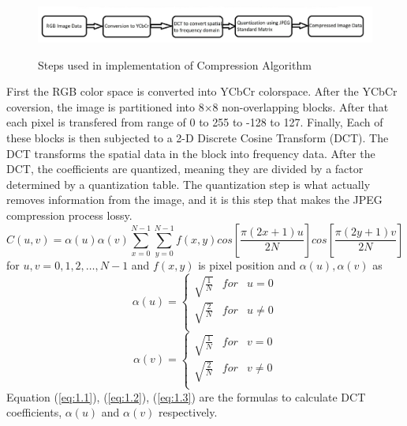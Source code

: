 \begin{figure}[H]
    \includegraphics[width=1\textwidth]{./img/compression.png}\\
    \caption{ Steps used in implementation of Compression Algorithm\cite{15}}
\end{figure}
\begin{flushleft} 
\end{flushleft} 
First the RGB color space is converted into YCbCr colorspace. After the YCbCr coversion, the image is partitioned into 8$\times$8 non-overlapping blocks. After that each pixel is transfered from range of 0 to 255 to -128 to 127. Finally, Each of these blocks is then subjected to a 2-D Discrete Cosine Transform (DCT). The DCT transforms the spatial data in the block into frequency data. After the DCT, the coefficients are quantized, meaning they are divided by a factor determined by a quantization table. The quantization step is what actually removes information from the image, and it is this step that makes the JPEG compression process lossy.
\begin{equation} \label{eq:1.1} 
    C(u,v)=\alpha(u)\alpha(v)\sum_{x=0}^{N-1} \sum_{y=0}^{N-1} f(x,y) cos[\frac{\pi(2x+1)u}{2N}] cos[\frac{\pi(2y+1)v}{2N}]
\end{equation}
\hspace{1cm} for $u,v = 0,1,2,…,N-1$ and $f(x,y)$ is pixel position and $\alpha(u),\alpha(v)$ as 
\begin{equation}\label{eq:1.2}  
    \alpha(u)=\left\{\begin{matrix}
        \sqrt{\frac{1}{N}}& for & u=0 \\
        \sqrt{\frac{2}{N}}& for & u\neq 0 \\
       \end{matrix}\right.
\end{equation}
\begin{equation}\label{eq:1.3}   
    \alpha(v)=\left\{\begin{matrix}
        \sqrt{\frac{1}{N}}& for & v=0 \\
        \sqrt{\frac{2}{N}}& for & v\neq 0 \\
       \end{matrix}\right.
\end{equation}
Equation (\ref{eq:1.1}), (\ref{eq:1.2}), (\ref{eq:1.3}) are the formulas to calculate DCT coefficients, $\alpha(u)$ and $\alpha(v)$ respectively.\cite{4}\\ \\
